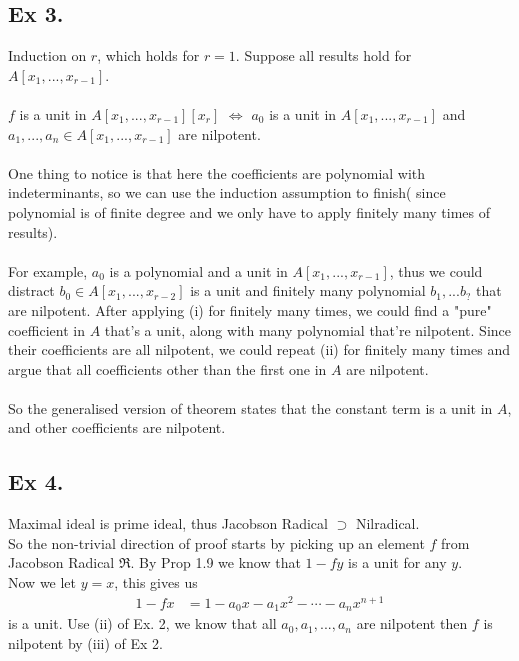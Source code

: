 \subsection{Ex 3.}\label{Atiyah Chapter 1 Ex 3.}
Induction on $r$, which holds for $r=1$. Suppose all results hold for $A[x_1,...,x_{r-1}]$.\\\\
$f$ is a unit in $A[x_1,...,x_{r-1}][x_r]$ $\Leftrightarrow$ $a_0$ is a unit in $A[x_1,...,x_{r-1}]$ and $a_1,...,a_n\in A[x_1,...,x_{r-1}]$ are nilpotent.\\\\
One thing to notice is that here the coefficients are polynomial with indeterminants, so we can use the induction assumption to finish( since polynomial is of finite degree and we only have to apply finitely many times of results).\\\\
For example, $a_0$ is a polynomial and a unit in $A[x_1,...,x_{r-1}]$, thus we could distract $b_0\in A[x_1,...,x_{r-2}]$ is a unit and finitely many polynomial $b_1,...b_{?}$ that are nilpotent.
After applying (i) for finitely many times, we could find a "pure" coefficient in $A$ that's a unit, along with many polynomial that're nilpotent. Since their coefficients are all nilpotent, we could repeat (ii) for finitely many times and argue that all coefficients other than the first one in $A$ are nilpotent.\\\\
So the generalised version of theorem states that the constant term is a unit in $A$, and other coefficients are nilpotent.



\subsection{Ex 4.}
Maximal ideal is prime ideal, thus Jacobson Radical $\supset $ Nilradical.\\
So the non-trivial direction of proof starts by picking up an element $f$ from Jacobson Radical $\mathfrak{R}$. 
By Prop 1.9 we know that $1-fy$ is a unit for any $y$.\\
Now we let $y=x$, this gives us
\begin{align*}
    1-fx&=1-a_0x-a_1x^2-\cdots-a_nx^{n+1}
\end{align*}is a unit. Use (ii) of Ex. 2, we know that all $a_0,a_1,...,a_n$ are nilpotent then $f$ is nilpotent by (iii) of Ex 2.



